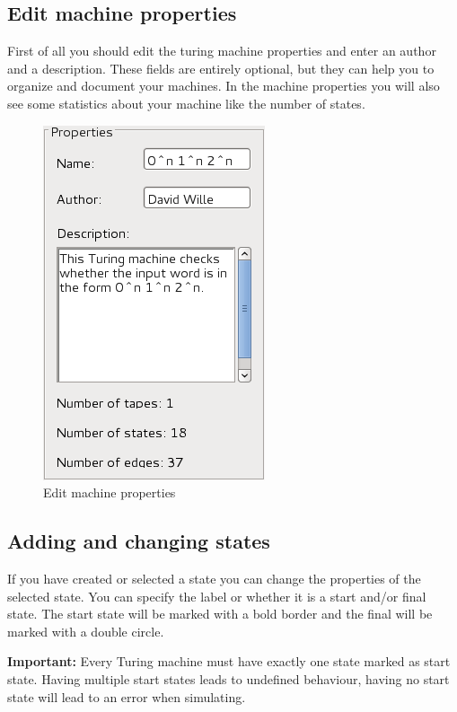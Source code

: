 \documentclass[%
  a4paper,%
  11pt,%
  blue,%
  hyperref	%
  ]{tubsartcl}
\begin{document}
\clearpage

\subsection{Edit machine properties}
\label{sec:edit-mach-prop}
First of all you should edit the turing machine properties and enter an author and a description. These fields are entirely optional, but they can help you to organize and document your machines. In the machine properties you will also see some statistics about your machine like the number of states.
\begin{figure}[!htb]
\begin{center}
\includegraphics[scale=0.5]{graphics_gui/machine_properties.png}
\end{center}
\caption{Edit machine properties}
\label{pic:machine_properties}
\end{figure}

\subsection{Adding and changing states}
\label{sec:add-edit-states}
If you have created or selected a state you can change the properties of the selected state. You can specify the label or whether it is a start and/or final state. The start state will be marked with a bold border and the final will be marked with a double circle.

\textbf{Important:} Every Turing machine must have exactly one state marked as start state. Having multiple start states leads to undefined behaviour, having no start state will lead to an error when simulating.
\end{document}
